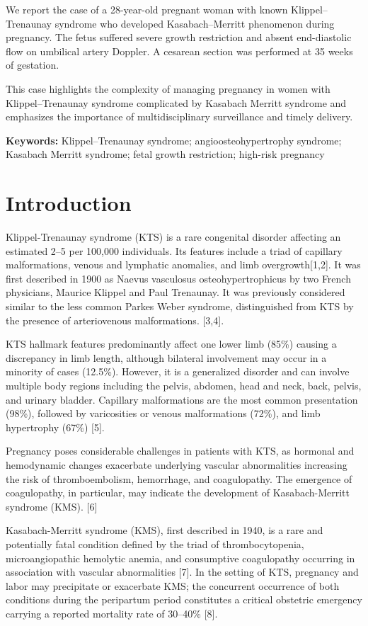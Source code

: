 \documentclass[
  letterpaper,
  DIV=11,
  numbers=noendperiod]{scrartcl}
\begin{document}
We report the case of a 28-year-old pregnant woman with known
Klippel--Trenaunay syndrome who developed Kasabach--Merritt phenomenon
during pregnancy. The fetus suffered severe growth restriction and
absent end-diastolic flow on umbilical artery Doppler. A cesarean
section was performed at 35 weeks of gestation.

This case highlights the complexity of managing pregnancy in women with
Klippel--Trenaunay syndrome complicated by Kasabach Merritt syndrome and
emphasizes the importance of multidisciplinary surveillance and timely
delivery.

\textbf{Keywords:} Klippel--Trenaunay syndrome; angioosteohypertrophy
syndrome; Kasabach Merritt syndrome; fetal growth restriction; high-risk
pregnancy

\section{Introduction}\label{introduction}

Klippel-Trenaunay syndrome (KTS) is a rare congenital disorder affecting
an estimated 2--5 per 100,000 individuals. Its features include a triad
of capillary malformations, venous and lymphatic anomalies, and limb
overgrowth{[}1,2{]}. It was first described in 1900 as Naevus vasculosus
osteohypertrophicus by two French physicians, Maurice Klippel and Paul
Trenaunay. It was previously considered similar to the less common
Parkes Weber syndrome, distinguished from KTS by the presence of
arteriovenous malformations. {[}3,4{]}.

KTS hallmark features predominantly affect one lower limb (85\%) causing
a discrepancy in limb length, although bilateral involvement may occur
in a minority of cases (12.5\%). However, it is a generalized disorder
and can involve multiple body regions including the pelvis, abdomen,
head and neck, back, pelvis, and urinary bladder. Capillary
malformations are the most common presentation (98\%), followed by
varicosities or venous malformations (72\%), and limb hypertrophy (67\%)
{[}5{]}.

Pregnancy poses considerable challenges in patients with KTS, as
hormonal and hemodynamic changes exacerbate underlying vascular
abnormalities increasing the risk of thromboembolism, hemorrhage, and
coagulopathy. The emergence of coagulopathy, in particular, may indicate
the development of Kasabach-Merritt syndrome (KMS). {[}6{]}

Kasabach-Merritt syndrome (KMS), first described in 1940, is a rare and
potentially fatal condition defined by the triad of thrombocytopenia,
microangiopathic hemolytic anemia, and consumptive coagulopathy
occurring in association with vascular abnormalities {[}7{]}. In the
setting of KTS, pregnancy and labor may precipitate or exacerbate KMS;
the concurrent occurrence of both conditions during the peripartum
period constitutes a critical obstetric emergency carrying a reported
mortality rate of 30--40\% {[}8{]}.
\end{document}
